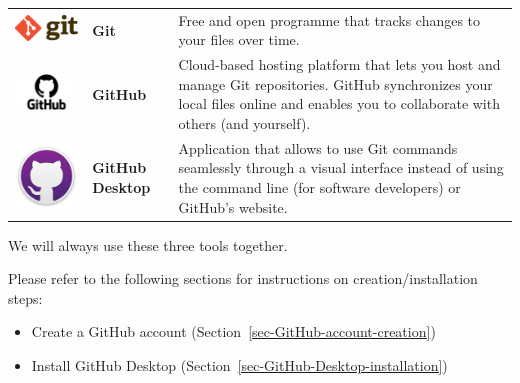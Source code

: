 \documentclass[
  letterpaper,
  DIV=11,
  numbers=noendperiod,
  oneside]{scrreprt}
\providecommand{\tightlist}{%
  \setlength{\itemsep}{0pt}\setlength{\parskip}{0pt}}\usepackage{longtable,booktabs,array}
\begin{document}
\begin{longtable}[]{@{}
  >{\centering\arraybackslash}p{}
  >{\centering\arraybackslash}p{}
  >{\raggedright\arraybackslash}p{}@{}}
\toprule\noalign{}
\endhead
\bottomrule\noalign{}
\endlastfoot
\includegraphics{images/paste-5B5DE956.png} & \textbf{Git} & Free and
open programme that tracks changes to your files over time. \\
\includegraphics{images/paste-A0B6FCC4.png} & \textbf{GitHub} &
Cloud-based hosting platform that lets you host and manage Git
repositories. GitHub synchronizes your local files online and enables
you to collaborate with others (and yourself). \\
\includegraphics[width=1.25in,height=\textheight]{images/paste-B8632B75.png}
& \textbf{GitHub Desktop} & Application that allows to use Git commands
seamlessly through a visual interface instead of using the command line
(for software developers) or GitHub's website. \\
\end{longtable}

We will always use these three tools together.

Please refer to the following sections for instructions on
creation/installation steps:

\begin{itemize}
\tightlist
\item
  Create a GitHub account (Section~\ref{sec-GitHub-account-creation})
\item
  Install GitHub Desktop (Section~\ref{sec-GitHub-Desktop-installation})
\end{itemize}
\end{document}
